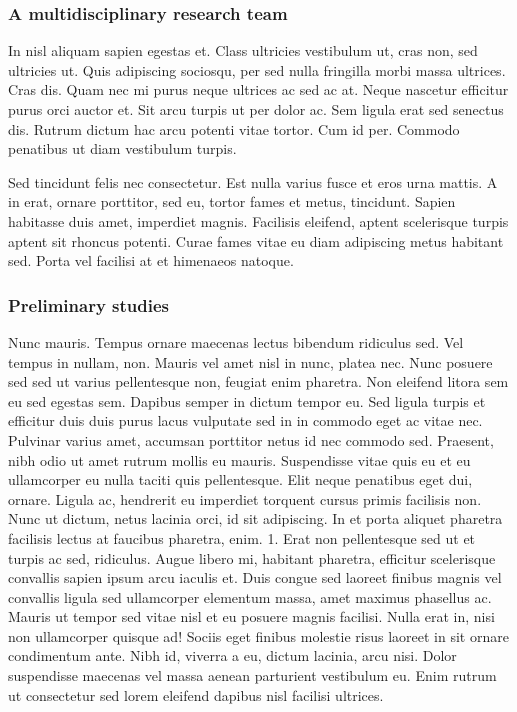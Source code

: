 \documentclass[11pt,]{article}
\begin{document}
\hypertarget{a-multidisciplinary-research-team}{%
\subsubsection{A multidisciplinary research
team}\label{a-multidisciplinary-research-team}}

In nisl aliquam sapien egestas et. Class ultricies vestibulum ut, cras
non, sed ultricies ut. Quis adipiscing sociosqu, per sed nulla fringilla
morbi massa ultrices. Cras dis. Quam nec mi purus neque ultrices ac sed
ac at. Neque nascetur efficitur purus orci auctor et. Sit arcu turpis ut
per dolor ac. Sem ligula erat sed senectus dis. Rutrum dictum hac arcu
potenti vitae tortor. Cum id per. Commodo penatibus ut diam vestibulum
turpis.

Sed tincidunt felis nec consectetur. Est nulla varius fusce et eros urna
mattis. A in erat, ornare porttitor, sed eu, tortor fames et metus,
tincidunt. Sapien habitasse duis amet, imperdiet magnis. Facilisis
eleifend, aptent scelerisque turpis aptent sit rhoncus potenti. Curae
fames vitae eu diam adipiscing metus habitant sed. Porta vel facilisi at
et himenaeos natoque.

\hypertarget{preliminary-studies}{%
\subsubsection{Preliminary studies}\label{preliminary-studies}}

Nunc mauris. Tempus ornare maecenas lectus bibendum ridiculus sed. Vel
tempus in nullam, non. Mauris vel amet nisl in nunc, platea nec. Nunc
posuere sed sed ut varius pellentesque non, feugiat enim pharetra. Non
eleifend litora sem eu sed egestas sem. Dapibus semper in dictum tempor
eu. Sed ligula turpis et efficitur duis duis purus lacus vulputate sed
in in commodo eget ac vitae nec. Pulvinar varius amet, accumsan
porttitor netus id nec commodo sed. Praesent, nibh odio ut amet rutrum
mollis eu mauris. Suspendisse vitae quis eu et eu ullamcorper eu nulla
taciti quis pellentesque. Elit neque penatibus eget dui, ornare. Ligula
ac, hendrerit eu imperdiet torquent cursus primis facilisis non. Nunc ut
dictum, netus lacinia orci, id sit adipiscing. In et porta aliquet
pharetra facilisis lectus at faucibus pharetra, enim. 1. Erat non
pellentesque sed ut et turpis ac sed, ridiculus. Augue libero mi,
habitant pharetra, efficitur scelerisque convallis sapien ipsum arcu
iaculis et. Duis congue sed laoreet finibus magnis vel convallis ligula
sed ullamcorper elementum massa, amet maximus phasellus ac. Mauris ut
tempor sed vitae nisl et eu posuere magnis facilisi. Nulla erat in, nisi
non ullamcorper quisque ad! Sociis eget finibus molestie risus laoreet
in sit ornare condimentum ante. Nibh id, viverra a eu, dictum lacinia,
arcu nisi. Dolor suspendisse maecenas vel massa aenean parturient
vestibulum eu. Enim rutrum ut consectetur sed lorem eleifend dapibus
nisl facilisi ultrices.
\end{document}
